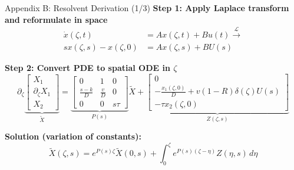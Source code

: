\documentclass[8pt]{beamer}
\begin{document}
\begin{frame}{Appendix B: Resolvent Derivation (1/3)}
\label{app:resolvent}
\textbf{Step 1: Apply Laplace transform and reformulate in space}
\begin{equation}
\begin{aligned}
    \dot{x}(\zeta, t) &= A x(\zeta, t) + B u(t) \xrightarrow{\mathcal{L}} \\
    s x(\zeta,s) - x(\zeta,0) &= A x(\zeta,s) + B U(s)
\end{aligned}
\end{equation}

\vspace{1mm}
\textbf{Step 2: Convert PDE to spatial ODE in \(\zeta\)}
\begin{equation}
\partial_\zeta \underbrace{\begin{bmatrix}
    X_1 \\ \partial_\zeta X_1 \\ X_2
\end{bmatrix}}_{\tilde{X}} =
\underbrace{\begin{bmatrix}
    0 & 1 & 0 \\
    \frac{s-k}{D} & \frac{v}{D} & 0 \\
    0 & 0 & s\tau
\end{bmatrix}}_{P(s)} \tilde{X}
+
\underbrace{\begin{bmatrix}
    0 \\
    -\frac{x_1(\zeta,0)}{D} + v(1-R) \delta(\zeta) U(s) \\
    -\tau x_2(\zeta,0)
\end{bmatrix}}_{Z(\zeta,s)}
\end{equation}

\vspace{1mm}
\textbf{Solution (variation of constants):}
\begin{equation}
\tilde{X}(\zeta,s) = e^{P(s)\zeta} \tilde{X}(0,s) + \int_0^\zeta e^{P(s)(\zeta - \eta)} Z(\eta,s) \, d\eta
\end{equation}

\end{frame}
\end{document}
